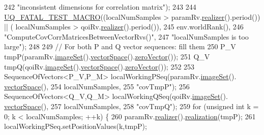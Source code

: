 \begin{DoxyCode}
242                       \textcolor{stringliteral}{"inconsistent dimensions for correlation matrix"});
243 
244   \hyperlink{_defines_8h_a56d63d18d0a6d45757de47fcc06f574d}{UQ\_FATAL\_TEST\_MACRO}((localNumSamples > paramRv.\hyperlink{class_q_u_e_s_o_1_1_base_vector_r_v_aea4b01eef0baf36944d14459a7b9ccf4}{realizer}().period()) || (
      localNumSamples > qoiRv.\hyperlink{class_q_u_e_s_o_1_1_base_vector_r_v_aea4b01eef0baf36944d14459a7b9ccf4}{realizer}().period()),
245                       env.worldRank(),
246                       \textcolor{stringliteral}{"ComputeCovCorrMatricesBetweenVectorRvs()"},
247                       \textcolor{stringliteral}{"localNumSamples is too large"});
248 
249   \textcolor{comment}{// For both P and Q vector sequences: fill them}
250   P\_V tmpP(paramRv.\hyperlink{class_q_u_e_s_o_1_1_base_vector_r_v_aa4dd2f036228eac1f945bacc7147a922}{imageSet}().\hyperlink{class_q_u_e_s_o_1_1_vector_set_a923421590baf5bf93cf066e528f927dc}{vectorSpace}().\hyperlink{class_q_u_e_s_o_1_1_vector_space_a92e963bb5cab3eecd290dfe4b8f03b04}{zeroVector}());
251   Q\_V tmpQ(qoiRv.\hyperlink{class_q_u_e_s_o_1_1_base_vector_r_v_aa4dd2f036228eac1f945bacc7147a922}{imageSet}().\hyperlink{class_q_u_e_s_o_1_1_vector_set_a923421590baf5bf93cf066e528f927dc}{vectorSpace}().\hyperlink{class_q_u_e_s_o_1_1_vector_space_a92e963bb5cab3eecd290dfe4b8f03b04}{zeroVector}());
252 
253   SequenceOfVectors<P\_V,P\_M> localWorkingPSeq(paramRv.\hyperlink{class_q_u_e_s_o_1_1_base_vector_r_v_aa4dd2f036228eac1f945bacc7147a922}{imageSet}().
      \hyperlink{class_q_u_e_s_o_1_1_vector_set_a923421590baf5bf93cf066e528f927dc}{vectorSpace}(),
254                                                      localNumSamples,
255                                                      \textcolor{stringliteral}{"covTmpP"});
256   SequenceOfVectors<Q\_V,Q\_M> localWorkingQSeq(qoiRv.\hyperlink{class_q_u_e_s_o_1_1_base_vector_r_v_aa4dd2f036228eac1f945bacc7147a922}{imageSet}().
      \hyperlink{class_q_u_e_s_o_1_1_vector_set_a923421590baf5bf93cf066e528f927dc}{vectorSpace}(),
257                                                      localNumSamples,
258                                                      \textcolor{stringliteral}{"covTmpQ"});
259   \textcolor{keywordflow}{for} (\textcolor{keywordtype}{unsigned} \textcolor{keywordtype}{int} k = 0; k < localNumSamples; ++k) \{
260     paramRv.\hyperlink{class_q_u_e_s_o_1_1_base_vector_r_v_aea4b01eef0baf36944d14459a7b9ccf4}{realizer}().\hyperlink{class_q_u_e_s_o_1_1_base_vector_realizer_a6845173dd79a80ae11c86cde26e55817}{realization}(tmpP);
261     localWorkingPSeq.setPositionValues(k,tmpP);

\end{DoxyCode}
